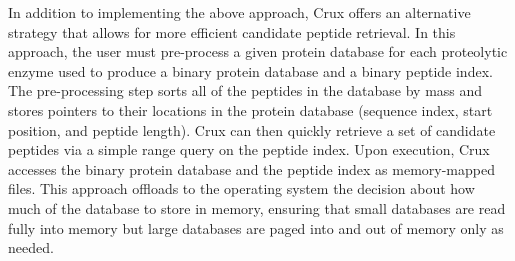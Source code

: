 \documentclass[12pt]{article}
\begin{document}
In addition to implementing the above approach, Crux offers an
alternative strategy that allows for more efficient candidate peptide
retrieval.  In this approach, the user must pre-process a given
protein database for each proteolytic enzyme used 
to produce a binary protein database and a binary
peptide index.  The pre-processing step sorts all of the peptides in
the database by mass and stores pointers to their locations in the
protein database (sequence index, start position, and peptide length).
Crux can then quickly retrieve a set of candidate peptides via a
simple range query on the peptide index.  Upon execution, Crux
accesses the binary protein database and the peptide index as
memory-mapped files.  This approach offloads to the operating system
the decision about how much of the database to store in memory,
ensuring that small databases are read fully into memory but large
databases are paged into and out of memory only as needed.
\end{document}
